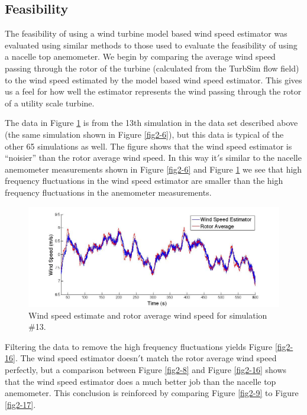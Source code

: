 \subsection{Feasibility} \label{section2-4-1} 

The feasibility of using a wind turbine model based wind speed estimator was evaluated using similar methods to those used to evaluate the feasibility of using a nacelle top anemometer. We begin by comparing the average wind speed passing through the rotor of the turbine (calculated from the TurbSim flow field) to the wind speed estimated by the model based wind speed estimator.  This gives us a feel for how well the estimator represents the wind passing through the rotor of a utility scale turbine.

The data in Figure \ref{fig2-15} is from the 13th simulation in the data set described above (the same simulation shown in Figure \ref{fig2-6}), but this data is typical of the other 65 simulations as well. The figure shows that the wind speed estimator is “noisier” than the rotor average wind speed. In this way it$'$s similar to the nacelle anemometer measurements shown in Figure \ref{fig2-6} and Figure \ref{fig2-15} we see that high frequency fluctuations in the wind speed estimator are smaller than the high frequency fluctuations in the anemometer measurements. 

\begin{figure}[htbp]
	\centering
		\includegraphics[width = \linewidth]{Figures/ch2Figures/fig2-15.jpg}
		
	\caption{Wind speed estimate and rotor average wind speed for simulation \#13.}
	\label{fig2-15}
\end{figure}


Filtering the data to remove the high frequency fluctuations yields Figure \ref{fig2-16}. The wind speed estimator doesn$'$t match the rotor average wind speed perfectly, but a comparison between Figure \ref{fig2-8} and Figure \ref{fig2-16} shows that the wind speed estimator does a much better job than the nacelle top anemometer. This conclusion is reinforced by comparing Figure \ref{fig2-9} to Figure \ref{fig2-17}.

